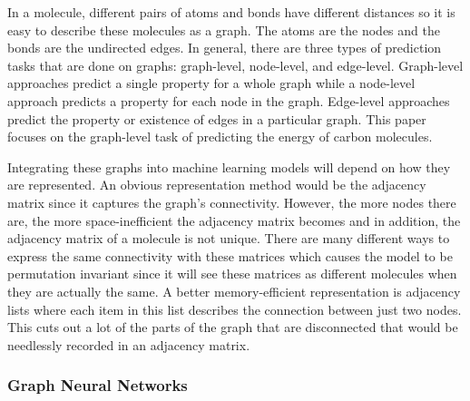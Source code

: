 \documentclass[12pt, abstract = true]{scrartcl}
\begin{document}
In a molecule, different pairs of atoms and bonds have different distances so it is easy to describe
these molecules as a graph. The atoms are the nodes and the bonds are the undirected edges. In general, 
there are three types of prediction tasks that are done on graphs: graph-level, node-level, and edge-level. 
Graph-level approaches predict a single property for a whole graph while a node-level approach predicts 
a property for each node in the graph. Edge-level approaches predict the property or existence of edges 
in a particular graph. This paper focuses on the graph-level task of predicting the energy of carbon 
molecules. 

Integrating these graphs into machine learning models will depend on how they are represented. 
An obvious representation method would be the adjacency matrix since it captures the graph's connectivity. 
However, the more nodes there are, the more space-inefficient the adjacency matrix becomes and in addition,
the adjacency matrix of a molecule is not unique. There are many different ways to express the same 
connectivity with these matrices which causes the model to be permutation invariant since it will see 
these matrices as different molecules when they are actually the same. A better memory-efficient representation 
is adjacency lists where each item in this list describes the connection between just two nodes. This cuts out 
a lot of the parts of the graph that are disconnected that would be needlessly recorded in an adjacency matrix.


\subsubsection{Graph Neural Networks}    
\end{document}
